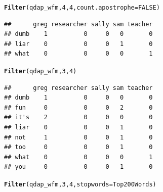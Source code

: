 \documentclass{article}\usepackage[]{graphicx}\usepackage[]{color}
\makeatletter
\newcommand{\hlnum}[1]{\textcolor[rgb]{0.686,0.059,0.569}{#1}}%
\newcommand{\hlstd}[1]{\textcolor[rgb]{0.345,0.345,0.345}{#1}}%
\newcommand{\hlkwc}[1]{\textcolor[rgb]{0.333,0.667,0.333}{#1}}%
\newcommand{\hlkwd}[1]{\textcolor[rgb]{0.737,0.353,0.396}{\textbf{#1}}}%
\newenvironment{kframe}{%
 \def\at@end@of@kframe{}%
 \ifinner\ifhmode%
  \def\at@end@of@kframe{\end{minipage}}%
  \begin{minipage}{\columnwidth}%
 \fi\fi%
 \def\FrameCommand##1{\hskip\@totalleftmargin \hskip-\fboxsep
 \colorbox{shadecolor}{##1}\hskip-\fboxsep
     \hskip-\linewidth \hskip-\@totalleftmargin \hskip\columnwidth}%
 \MakeFramed {\advance\hsize-\width
   \@totalleftmargin\z@ \linewidth\hsize
   \@setminipage}}%
 {\par\unskip\endMakeFramed%
 \at@end@of@kframe}
\newenvironment{knitrout}{}{} %
\makeatother
\begin{document}
\begin{knitrout}
\color{fgcolor}\begin{kframe}
\begin{alltt}
\hlkwd{Filter}\hlstd{(qdap_wfm,} \hlnum{4}\hlstd{,} \hlnum{4}\hlstd{,} \hlkwc{count.apostrophe} \hlstd{=} \hlnum{FALSE}\hlstd{)}
\end{alltt}
\end{kframe}
\end{knitrout}


\begin{knitrout}
\color{fgcolor}\begin{kframe}
\begin{verbatim}
##      greg researcher sally sam teacher
## dumb    1          0     0   0       0
## liar    0          0     0   1       0
## what    0          0     0   0       1
\end{verbatim}
\end{kframe}
\end{knitrout}


\begin{knitrout}
\color{fgcolor}\begin{kframe}
\begin{alltt}
\hlkwd{Filter}\hlstd{(qdap_wfm,} \hlnum{3}\hlstd{,} \hlnum{4}\hlstd{)}
\end{alltt}
\end{kframe}
\end{knitrout}


\begin{knitrout}
\color{fgcolor}\begin{kframe}
\begin{verbatim}
##      greg researcher sally sam teacher
## dumb    1          0     0   0       0
## fun     0          0     0   2       0
## it's    2          0     0   0       0
## liar    0          0     0   1       0
## not     1          0     0   1       0
## too     0          0     0   1       0
## what    0          0     0   0       1
## you     0          0     0   1       0
\end{verbatim}
\end{kframe}
\end{knitrout}


\begin{knitrout}
\color{fgcolor}\begin{kframe}
\begin{alltt}
\hlkwd{Filter}\hlstd{(qdap_wfm,} \hlnum{3}\hlstd{,} \hlnum{4}\hlstd{,} \hlkwc{stopwords} \hlstd{= Top200Words)}
\end{alltt}
\end{kframe}
\end{knitrout}
\end{document}
